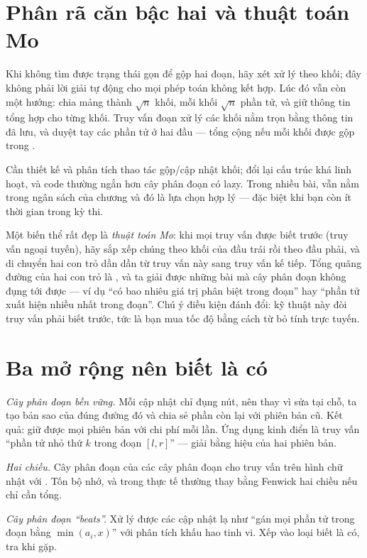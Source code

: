 \documentclass[../../algorithm.tex]{subfiles}
\begin{document}
\section{Phân rã căn bậc hai và thuật toán Mo}

Khi không tìm được trạng thái gọn để gộp hai đoạn, hãy xét xử lý theo khối; đây không phải lời giải tự động cho mọi phép toán không kết hợp. Lúc đó vẫn còn một hướng: chia mảng thành \(\sqrt{n}\) khối, mỗi khối \(\sqrt{n}\) phần tử, và giữ thông tin tổng hợp cho từng khối. Truy vấn đoạn xử lý các khối nằm trọn bằng thông tin đã lưu, và duyệt tay các phần tử ở hai đầu --- tổng cộng  nếu mỗi khối được gộp trong .

Cần thiết kế và phân tích thao tác gộp/cập nhật khối; đổi lại cấu trúc khá linh hoạt, và code thường ngắn hơn cây phân đoạn có lazy. Trong nhiều bài,  vẫn nằm trong ngân sách của chương  và đó là lựa chọn hợp lý --- đặc biệt khi bạn còn ít thời gian trong kỳ thi.

Một biến thể rất đẹp là \emph{thuật toán Mo}: khi mọi truy vấn được biết trước (truy vấn ngoại tuyến), hãy sắp xếp chúng theo khối của đầu trái rồi theo đầu phải, và di chuyển hai con trỏ dần dần từ truy vấn này sang truy vấn kế tiếp. Tổng quãng đường của hai con trỏ là , và ta giải được những bài mà cây phân đoạn không đụng tới được --- ví dụ ``có bao nhiêu giá trị phân biệt trong đoạn'' hay ``phần tử xuất hiện nhiều nhất trong đoạn''. Chú ý điều kiện đánh đổi: kỹ thuật này đòi truy vấn phải biết trước, tức là bạn mua tốc độ bằng cách từ bỏ tính trực tuyến.

\section{Ba mở rộng nên biết là có}

\emph{Cây phân đoạn bền vững.} Mỗi cập nhật chỉ đụng  nút, nên thay vì sửa tại chỗ, ta tạo bản sao của đúng đường đó và chia sẻ phần còn lại với phiên bản cũ. Kết quả: giữ được mọi phiên bản với chi phí  mỗi lần. Ứng dụng kinh điển là truy vấn ``phần tử nhỏ thứ \(k\) trong đoạn \([l,r]\)'' --- giải bằng hiệu của hai phiên bản.

\emph{Hai chiều.} Cây phân đoạn của các cây phân đoạn cho truy vấn trên hình chữ nhật với . Tốn bộ nhớ, và trong thực tế thường thay bằng Fenwick hai chiều nếu chỉ cần tổng.

\emph{Cây phân đoạn ``beats''.} Xử lý được các cập nhật lạ như ``gán mọi phần tử trong đoạn bằng \(\min(a_i, x)\)'' với phân tích khấu hao tinh vi. Xếp vào loại biết là có, tra khi gặp.
\end{document}
